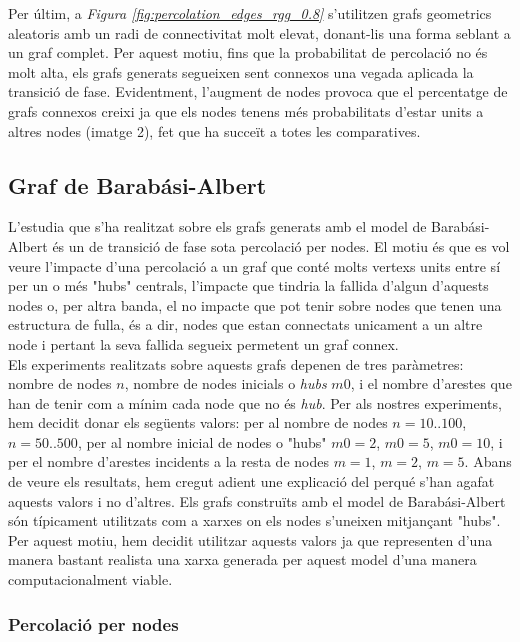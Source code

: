 \documentclass[a4paper]{article}
\begin{document}
	Per últim, a \textit{Figura \ref{fig:percolation_edges_rgg_0.8}} s'utilitzen grafs geometrics aleatoris amb un radi de connectivitat molt elevat, donant-lis una forma seblant a un graf complet. Per aquest motiu, fins que la probabilitat de percolació no és molt alta, els grafs generats segueixen
	sent connexos una vegada aplicada la transició de fase. Evidentment, l'augment de nodes provoca que el percentatge de grafs connexos creixi ja que els nodes tenens més probabilitats d'estar units a altres nodes (imatge 2), fet que ha succeït a totes les comparatives.
	
	\subsection{Graf de Barabási-Albert}
	
	L'estudia que s'ha realitzat sobre els grafs generats amb el model de Barabási-Albert és un de transició de fase sota percolació per nodes. El motiu és que es vol veure l'impacte d'una percolació a un graf que conté molts vertexs units entre sí per un o més "hubs" centrals, l'impacte que tindria la fallida d'algun d'aquests nodes o, per altra banda, el no impacte que pot tenir sobre nodes que tenen una estructura de fulla, és a dir, nodes que estan connectats unicament a un altre node i pertant la seva fallida segueix permetent un graf connex. \\
	
	Els experiments realitzats sobre aquests grafs depenen de tres paràmetres: nombre de nodes $n$, nombre de nodes inicials o \textit{hubs} $m0$, i el nombre d'arestes que han de tenir com a mínim cada node que no és \textit{hub}. Per als nostres experiments, hem decidit donar els següents valors: per al nombre de nodes $n = 10..100$, $n = 50..500$, per al nombre inicial de nodes o "hubs" $m0 = 2$, $m0 = 5$, $m0 = 10$, i per el nombre d'arestes incidents a la resta de nodes $m = 1$, $m = 2$, $m = 5$. Abans de veure els resultats, hem cregut adient une explicació del perqué s'han agafat aquests valors i no d'altres. Els grafs construïts amb el model de Barabási-Albert són típicament utilitzats com a xarxes on els nodes s'uneixen mitjançant "hubs". Per aquest motiu, hem decidit utilitzar aquests valors ja que representen d'una manera bastant realista una xarxa generada per aquest model d'una manera computacionalment viable. \\
	
	\subsubsection{Percolació per nodes}
	
\end{document}
